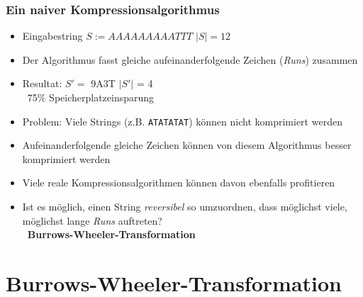 \documentclass[14pt,xcolor=dvipsnames,pdftex]{beamer}
\begin{document}
\begin{frame}[allowframebreaks]
\frametitle{Ein naiver Kompressionsalgorithmus}
\begin{itemize}
 \item Eingabestring $S := AAAAAAAAATTT$ \textrightarrow $|S| = 12$
 \item Der 	Algorithmus fasst gleiche aufeinanderfolgende Zeichen (\textit{Runs}) zusammen
 \item Resultat: $S' = $ 9A3T \textrightarrow $|S'|$ = 4\\	\textrightarrow\ 75\% Speicherplatzeinsparung
 \item Problem: Viele Strings (z.B. \texttt{ATATATAT}) können nicht komprimiert werden
\end{itemize}
\framebreak
\begin{itemize}
 \item Aufeinanderfolgende gleiche Zeichen können von diesem Algorithmus besser komprimiert werden
 \item Viele reale Kompressionsalgorithmen können davon ebenfalls profitieren
 \item Ist es möglich, einen String \textit{reversibel} so umzuordnen, dass möglichst viele, möglichst lange \textit{Runs} auftreten?\\
 \textrightarrow\ \textbf{Burrows-Wheeler-Transformation}
\end{itemize}
\end{frame}

\section{Burrows-Wheeler-Transformation}
\end{document}
